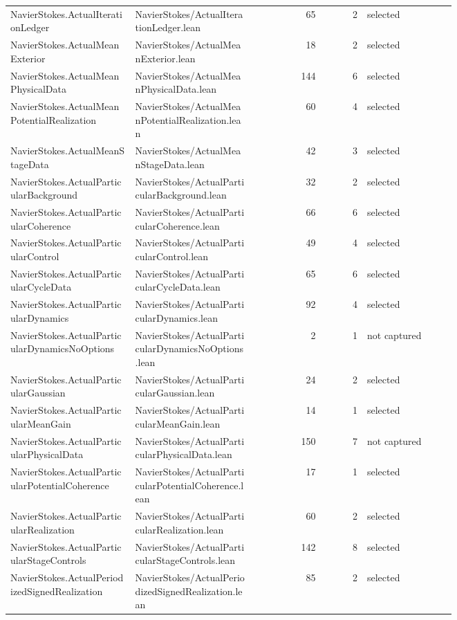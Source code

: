 \documentclass[10pt]{article}
\begin{document}
\begin{longtable}{p{0.28\linewidth}p{0.27\linewidth}r r p{0.20\linewidth}}
NavierStokes.ActualIterationLedger & NavierStokes/ActualIterationLedger.lean & 65 & 2 & selected\\
NavierStokes.ActualMeanExterior & NavierStokes/ActualMeanExterior.lean & 18 & 2 & selected\\
NavierStokes.ActualMeanPhysicalData & NavierStokes/ActualMeanPhysicalData.lean & 144 & 6 & selected\\
NavierStokes.ActualMeanPotentialRealization & NavierStokes/ActualMeanPotentialRealization.lean & 60 & 4 & selected\\
NavierStokes.ActualMeanStageData & NavierStokes/ActualMeanStageData.lean & 42 & 3 & selected\\
NavierStokes.ActualParticularBackground & NavierStokes/ActualParticularBackground.lean & 32 & 2 & selected\\
NavierStokes.ActualParticularCoherence & NavierStokes/ActualParticularCoherence.lean & 66 & 6 & selected\\
NavierStokes.ActualParticularControl & NavierStokes/ActualParticularControl.lean & 49 & 4 & selected\\
NavierStokes.ActualParticularCycleData & NavierStokes/ActualParticularCycleData.lean & 65 & 6 & selected\\
NavierStokes.ActualParticularDynamics & NavierStokes/ActualParticularDynamics.lean & 92 & 4 & selected\\
NavierStokes.ActualParticularDynamicsNoOptions & NavierStokes/ActualParticularDynamicsNoOptions.lean & 2 & 1 & not captured\\
NavierStokes.ActualParticularGaussian & NavierStokes/ActualParticularGaussian.lean & 24 & 2 & selected\\
NavierStokes.ActualParticularMeanGain & NavierStokes/ActualParticularMeanGain.lean & 14 & 1 & selected\\
NavierStokes.ActualParticularPhysicalData & NavierStokes/ActualParticularPhysicalData.lean & 150 & 7 & not captured\\
NavierStokes.ActualParticularPotentialCoherence & NavierStokes/ActualParticularPotentialCoherence.lean & 17 & 1 & selected\\
NavierStokes.ActualParticularRealization & NavierStokes/ActualParticularRealization.lean & 60 & 2 & selected\\
NavierStokes.ActualParticularStageControls & NavierStokes/ActualParticularStageControls.lean & 142 & 8 & selected\\
NavierStokes.ActualPeriodizedSignedRealization & NavierStokes/ActualPeriodizedSignedRealization.lean & 85 & 2 & selected\\

\end{longtable}
\end{document}
